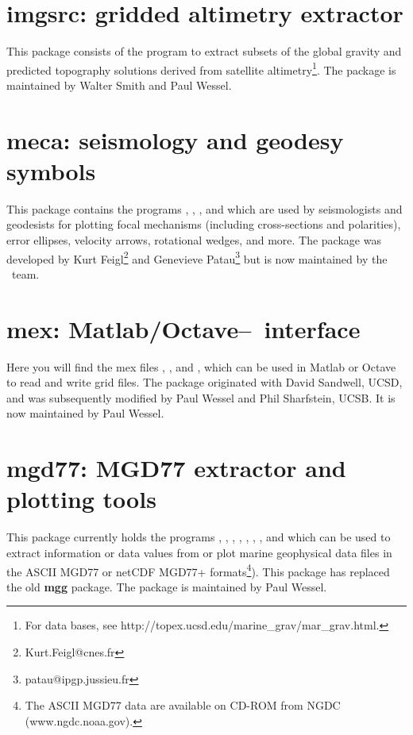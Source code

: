 \section{imgsrc: gridded altimetry extractor}

This package consists of the program  to
extract subsets of the global gravity and predicted topography
solutions derived from satellite altimetry\footnote{For data bases,
see http://topex.ucsd.edu/marine\_grav/mar\_grav.html.}.  The package
is maintained by Walter Smith and Paul Wessel.

\section{meca: seismology and geodesy symbols}

This package contains the programs , ,
, and  which are used
by seismologists and geodesists for plotting focal mechanisms (including
cross-sections and polarities), error ellipses, velocity arrows, rotational
wedges, and more.  The package was developed by
Kurt Feigl\footnote{Kurt.Feigl@cnes.fr} and
Genevieve Patau\footnote{patau@ipgp.jussieu.fr} but is now maintained by the \GMT\ team.

\section{mex: Matlab/Octave--\gmt\ interface}

Here you will find the mex files , ,
and , which can be used in Matlab or Octave to read and write
grid files.  The package originated with David Sandwell, UCSD,
and was subsequently modified by Paul Wessel and Phil Sharfstein, UCSB.
It is now maintained by Paul Wessel.

\section{mgd77: MGD77 extractor and plotting tools}

This package currently holds the programs , , ,
, , , , and  which can be
used to extract information or data values from or plot marine geophysical
data files in the ASCII MGD77 or netCDF MGD77+ formats\footnote{The ASCII MGD77 data are available on CD-ROM from NGDC
(www.ngdc.noaa.gov).}).  This package has replaced the old \textbf{mgg} package.
The package is maintained by Paul Wessel.

